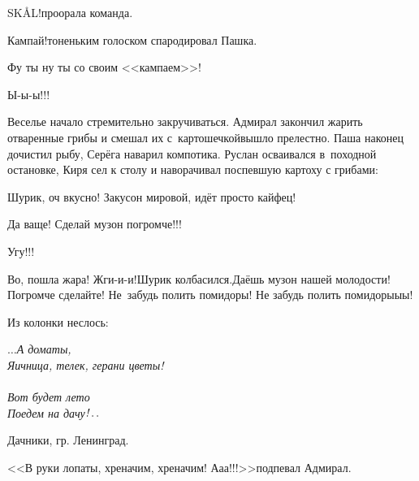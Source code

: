 \diagdash SKÅL!\mdash проорала команда.

\diagdash Кампай!\mdash тоненьким голоском спародировал Пашка.

\diagdash Фу ты ну ты со своим <<кампаем>>!

\diagdash Ы-ы-ы!!!

Веселье начало стремительно закручиваться. Адмирал закончил жарить отваренные грибы и смешал их с~картошечкой\mdash вышло прелестно. Паша наконец дочистил рыбу, Серёга наварил компотика. Руслан осваивался в~походной остановке, Киря сел к столу и наворачивал поспевшую картоху с грибами:

\diagdash Шурик, оч вкусно! Закусон мировой, идёт просто кайфец!

\diagdash Да ваще! Сделай музон погромче!!!

\diagdash Угу!!!

\diagdash Во, пошла жара! Жги-и-и!\mdash Шурик колбасился.\mdash Даёшь музон нашей молодости! Погромче сделайте! Не~забудь полить помидоры! Не забудь полить помидоры\sdash ы\sdash ы!

Из колонки неслось:

\vspace{0.3cm}
\noindent\textit{%
	\hspace*{3.4cm}$\ldots$А дома\mdash ты,\\
	\hspace*{3.4cm}Яичница, телек, герани цветы!\\
	\\
	\hspace*{3.4cm}Вот будет лето\mdash\\
	\hspace*{3.4cm}Поедем на дачу$\exldotsit$%
}

{\raggedleft \scriptsize \mdash Дачники, гр. Ленинград. \par}

\vspace{0.1cm}

\diagdash <<В руки лопаты, хреначим, хреначим! А\sdash а\sdash а!!!>>\mdash подпевал Адмирал.



